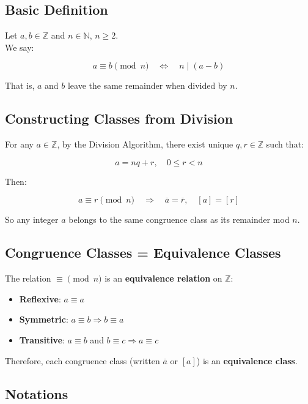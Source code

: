 \documentclass[
]{article}
\author{}
\date{}
\providecommand{\tightlist}{%
  \setlength{\itemsep}{0pt}\setlength{\parskip}{0pt}}
\begin{document}
\subsection{Basic Definition}\label{basic-definition}

Let \(a, b \in \mathbb{Z}\) and \(n \in \mathbb{N}\), \(n \geq 2\).\\
We say:

\[
a \equiv b \pmod{n} \quad \Leftrightarrow \quad n \mid (a - b)
\]

That is, \(a\) and \(b\) leave the same remainder when divided by \(n\).

\subsection{Constructing Classes from
Division}\label{constructing-classes-from-division}

For any \(a \in \mathbb{Z}\), by the Division Algorithm, there exist
unique \(q, r \in \mathbb{Z}\) such that:

\[
a = nq + r, \quad 0 \leq r < n
\]

Then:

\[
a \equiv r \pmod{n} \quad \Rightarrow \quad \overline{a} = \overline{r}, \quad [a] = [r]
\]

So any integer \(a\) belongs to the same congruence class as its
remainder mod \(n\).

\subsection{Congruence Classes = Equivalence Classes
}\label{congruence-classes-equivalence-classes}

The relation \(\equiv \pmod{n}\) is an \textbf{equivalence relation} on
\(\mathbb{Z}\):

\begin{itemize}
\tightlist
\item
  \textbf{Reflexive}: \(a \equiv a\)
\item
  \textbf{Symmetric}: \(a \equiv b \Rightarrow b \equiv a\)
\item
  \textbf{Transitive}: \(a \equiv b\) and
  \(b \equiv c \Rightarrow a \equiv c\)
\end{itemize}

Therefore, each congruence class (written \(\overline{a}\) or \([a]\))
is an \textbf{equivalence class}.

\subsection{Notations}\label{notations}
\end{document}
